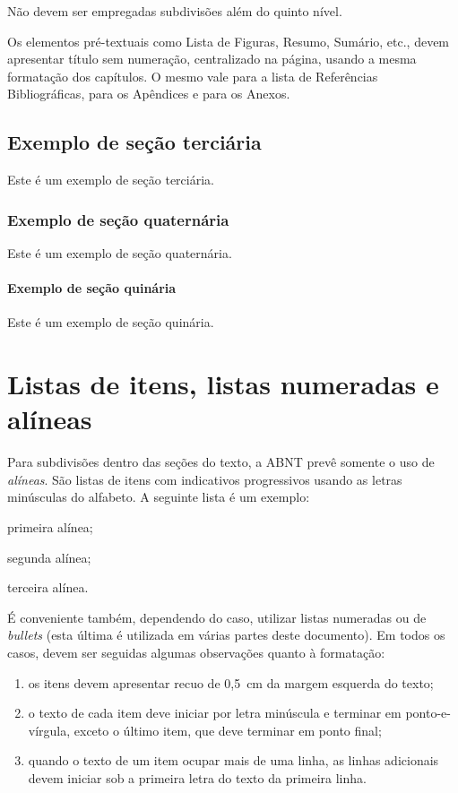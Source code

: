 \documentclass{ifsultcc}
\begin{document}
Não devem ser empregadas subdivisões além do quinto nível.

Os elementos pré-textuais como Lista de Figuras, Resumo, Sumário, etc., devem apresentar título sem numeração, centralizado na página, usando a mesma formatação dos capítulos.  O mesmo vale para a lista de Referências Bibliográficas, para os Apêndices e para os Anexos.

\subsection{Exemplo de seção terciária}
Este é um exemplo de seção terciária.

\subsubsection{Exemplo de seção quaternária}
Este é um exemplo de seção quaternária.

\paragraph{Exemplo de seção quinária}
Este é um exemplo de seção quinária.

\section{Listas de itens, listas numeradas e alíneas}
Para subdivisões dentro das seções do texto, a ABNT prevê somente o uso de \emph{alíneas}.  São listas de itens com indicativos progressivos usando as letras minúsculas do alfabeto.  A seguinte lista é um exemplo:
\begin{alineas}
	\item primeira alínea;
	\item segunda alínea;
	\item terceira alínea.
\end{alineas}

É conveniente também, dependendo do caso, utilizar listas numeradas ou de \textit{bullets} (esta última é utilizada em várias partes deste documento).  Em todos os casos, devem ser seguidas algumas observações quanto à formatação:
\begin{enumerate}
	\item os itens devem apresentar recuo de 0,5~cm da margem esquerda do texto;
	\item o texto de cada item deve iniciar por letra minúscula e terminar em ponto-e-vírgula, exceto o último item, que deve terminar em ponto final;
	\item quando o texto de um item ocupar mais de uma linha, as linhas adicionais devem iniciar sob a primeira letra do texto da primeira linha.
\end{enumerate}
\end{document}
